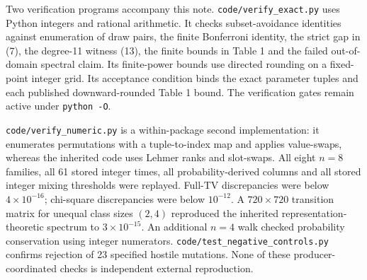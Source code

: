 \documentclass[
  british,
  11pt,
]{article}
\begin{document}
Two verification programs accompany this note.
\texttt{code/verify\_exact.py} uses Python integers and rational
arithmetic. It checks subset-avoidance identities against enumeration of
draw pairs, the finite Bonferroni identity, the strict gap in (7), the
degree-11 witness (13), the finite bounds in Table 1 and the failed
out-of-domain spectral claim. Its finite-power bounds use directed
rounding on a fixed-point integer grid. Its acceptance condition binds
the exact parameter tuples and each published downward-rounded Table 1
bound. The verification gates remain active under \texttt{python\ -O}.

\texttt{code/verify\_numeric.py} is a within-package second
implementation: it enumerates permutations with a tuple-to-index map and
applies value-swaps, whereas the inherited code uses Lehmer ranks and
slot-swaps. All eight \(n=8\) families, all 61 stored integer times, all
probability-derived columns and all stored integer mixing thresholds
were replayed. Full-TV discrepancies were below \(4\times10^{-16}\);
chi-square discrepancies were below \(10^{-12}\). A \(720\times720\)
transition matrix for unequal class sizes \((2,4)\) reproduced the
inherited representation-theoretic spectrum to \(3\times10^{-15}\). An
additional \(n=4\) walk checked probability conservation using integer
numerators. \texttt{code/test\_negative\_controls.py} confirms rejection
of 23 specified hostile mutations. None of these producer-coordinated
checks is independent external reproduction.
\end{document}
